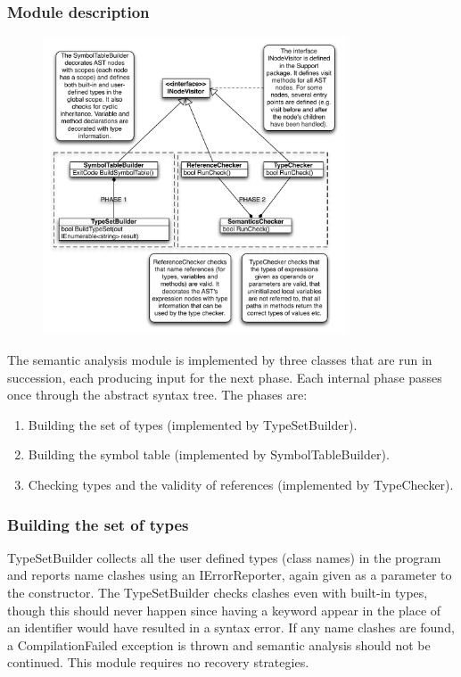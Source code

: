 \documentclass[a4paper,11pt]{article}
\begin{document}
\subsubsection{Module description}

\begin{figure}[h!]
\centering
\includegraphics[width=0.8\textwidth]{semantic_analysis.pdf}
\end{figure}

The semantic analysis module is implemented by three classes that are run in succession, each producing input for the next phase. Each internal phase passes once through the abstract syntax tree. The phases are:

\begin{enumerate}
\item Building the set of types (implemented by TypeSetBuilder).
\item Building the symbol table (implemented by SymbolTableBuilder).
\item Checking types and the validity of references (implemented by TypeChecker).
\end{enumerate}

\subsubsection{Building the set of types}

TypeSetBuilder collects all the user defined types (class names) in the program and reports name clashes using an IErrorReporter, again given as a parameter to the constructor. The TypeSetBuilder checks clashes even with built-in types, though this should never happen since having a keyword appear in the place of an identifier would have resulted in a syntax error. If any name clashes are found, a CompilationFailed exception is thrown and semantic analysis should not be continued. This module requires no recovery strategies.
\end{document}
